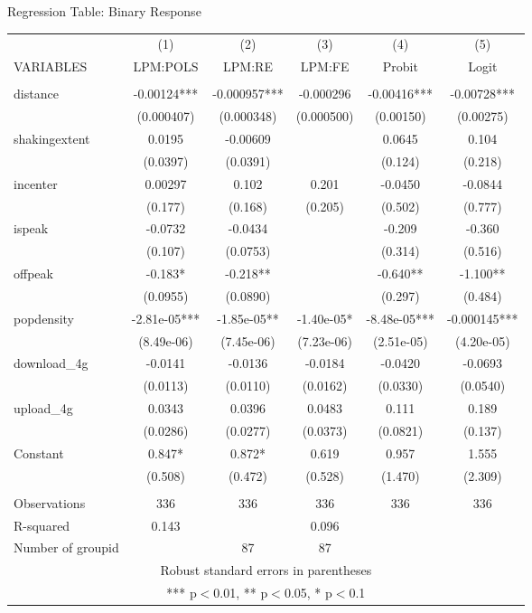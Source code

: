 \begin{frame}[fragile]{Regression Table: Binary Response}

\begin{table}[htbp]
\tiny

\begin{tabular}{lccccc} \hline
 & (1) & (2) & (3) & (4) & (5) \\
VARIABLES & LPM:POLS & LPM:RE & LPM:FE & Probit & Logit \\ \hline
 &  &  &  &  &  \\
distance & -0.00124*** & -0.000957*** & -0.000296 & -0.00416*** & -0.00728*** \\
 & (0.000407) & (0.000348) & (0.000500) & (0.00150) & (0.00275) \\
shakingextent & 0.0195 & -0.00609 &  & 0.0645 & 0.104 \\
 & (0.0397) & (0.0391) &  & (0.124) & (0.218) \\
incenter & 0.00297 & 0.102 & 0.201 & -0.0450 & -0.0844 \\
 & (0.177) & (0.168) & (0.205) & (0.502) & (0.777) \\
ispeak & -0.0732 & -0.0434 &  & -0.209 & -0.360 \\
 & (0.107) & (0.0753) &  & (0.314) & (0.516) \\
offpeak & -0.183* & -0.218** &  & -0.640** & -1.100** \\
 & (0.0955) & (0.0890) &  & (0.297) & (0.484) \\
popdensity & -2.81e-05*** & -1.85e-05** & -1.40e-05* & -8.48e-05*** & -0.000145*** \\
 & (8.49e-06) & (7.45e-06) & (7.23e-06) & (2.51e-05) & (4.20e-05) \\
download\_4g & -0.0141 & -0.0136 & -0.0184 & -0.0420 & -0.0693 \\
 & (0.0113) & (0.0110) & (0.0162) & (0.0330) & (0.0540) \\
upload\_4g & 0.0343 & 0.0396 & 0.0483 & 0.111 & 0.189 \\
 & (0.0286) & (0.0277) & (0.0373) & (0.0821) & (0.137) \\
Constant & 0.847* & 0.872* & 0.619 & 0.957 & 1.555 \\
 & (0.508) & (0.472) & (0.528) & (1.470) & (2.309) \\
 &  &  &  &  &  \\
Observations & 336 & 336 & 336 & 336 & 336 \\
R-squared & 0.143 &  & 0.096 &  &  \\
 Number of groupid &  & 87 & 87 &  &  \\ \hline
\multicolumn{6}{c}{ Robust standard errors in parentheses} \\
\multicolumn{6}{c}{ *** p$<$0.01, ** p$<$0.05, * p$<$0.1} \\
\end{tabular}


\end{table}
\end{frame}


